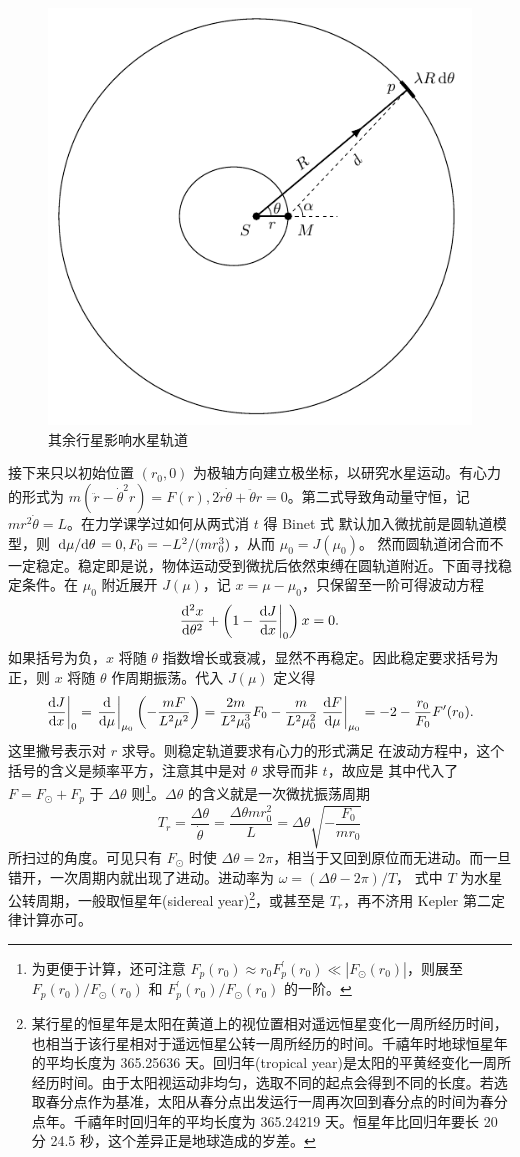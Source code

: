 \begin{figure}[t]
    \centering
    \includegraphics[width=.4\textwidth]{fig/chpt02/mercury.pdf}
    \caption{\small 其余行星影响水星轨道}
\end{figure}

接下来只以初始位置 $(r_0,0)$ 为极轴方向建立极坐标，以研究水星运动。有心力的形式为
$m(\ddot r-\dot\theta^2r)=F(r), 2\dot r\dot\theta+\ddot\theta r=0$。第二式导致角动量守恒，记 $mr^2{\dot \theta}=L$。在力学课学过如何从两式消 $t$ 得 Binet 式
默认加入微扰前是圆轨道模型，则 $\dv*{\mu}{\theta}=0,F_0=-{L^2}/{(mr_0^3)}$，从而 $\mu_0=J(\mu_0)$。
然而圆轨道闭合而不一定稳定。稳定即是说，物体运动受到微扰后依然束缚在圆轨道附近。下面寻找稳定条件。在 $\mu_0$ 附近展开 $J(\mu)$，记 $x=\mu-\mu_0$，只保留至一阶可得波动方程
\[
\dv[2]{x}{\theta}+\left(1-\eval{\dv{J}{x}}_{0}\right)x=0.
\]
如果括号为负，$x$ 将随 $\theta$ 指数增长或衰减，显然不再稳定。因此稳定要求括号为正，则 $x$ 将随 $\theta$ 作周期振荡。代入 $J(\mu)$ 定义得
\[\eval{\dv{J}{x}}_{0}=\eval{\dv{\mu}}_{\mu_0}\left(- \frac{mF}{L^2\mu^2} \right)= \frac{2m}{L^2\mu_0^3}F_0 - \frac{m}{L^2\mu_0^2} \eval{\dv{F}{\mu}}_{\mu_0} = -2 - \frac{r_0}{F_0} F'(r_0).\]
这里撇号表示对 $r$ 求导。则稳定轨道要求有心力的形式满足
在波动方程中，这个括号的含义是频率平方，注意其中是对 $\theta$ 求导而非 $t$，故应是
其中代入了 $F=F_{\odot}+F_p$ 于 $\Delta\theta$ 则\footnote{为更便于计算，还可注意 $F_p(r_0)\approx r_0 F_p^{\prime}(r_0) \ll |F_\odot(r_0)|$，则展至 $F_p(r_0) / F_\odot(r_0)$ 和 $F_p^{\prime}(r_0) / F_\odot(r_0)$ 的一阶。}。$\Delta\theta$ 的含义就是一次微扰振荡周期
\[
T_r=\frac{\Delta\theta}{\dot\theta}=\frac{\Delta\theta mr_0^2}{L}=\Delta\theta\sqrt{-\frac{F_0}{mr_0}}
\]
所扫过的角度。可见只有 $F_\odot$ 时使 $\Delta\theta=2\pi$，相当于又回到原位而无进动。而一旦错开，一次周期内就出现了进动。进动率为 $\omega=(\Delta\theta-2\pi)/T$，
式中 $T$ 为水星公转周期，一般取恒星年(sidereal year)\footnote{某行星的恒星年是太阳在黄道上的视位置相对遥远恒星变化一周所经历时间，也相当于该行星相对于遥远恒星公转一周所经历的时间。千禧年时地球恒星年的平均长度为 365.25636 天。回归年(tropical year)是太阳的平黄经变化一周所经历时间。由于太阳视运动非均匀，选取不同的起点会得到不同的长度。若选取春分点作为基准，太阳从春分点出发运行一周再次回到春分点的时间为春分点年。千禧年时回归年的平均长度为 365.24219 天。恒星年比回归年要长 20 分 24.5 秒，这个差异正是地球造成的岁差。}，或甚至是 $T_r$，再不济用 Kepler 第二定律计算亦可。

